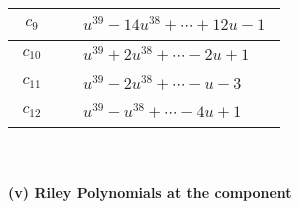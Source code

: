 \documentclass[1p]{elsarticle_modified}
\theoremstyle{definition}
\begin{document}
\begin{tabular}{m{50pt}|m{274pt}}
\hline $$\begin{aligned}c_{9}\end{aligned}$$&$\begin{aligned}
&u^{39}-14 u^{38}+\cdots+12 u-1
\end{aligned}$\\
\hline $$\begin{aligned}c_{10}\end{aligned}$$&$\begin{aligned}
&u^{39}+2 u^{38}+\cdots-2 u+1
\end{aligned}$\\
\hline $$\begin{aligned}c_{11}\end{aligned}$$&$\begin{aligned}
&u^{39}-2 u^{38}+\cdots- u-3
\end{aligned}$\\
\hline $$\begin{aligned}c_{12}\end{aligned}$$&$\begin{aligned}
&u^{39}- u^{38}+\cdots-4 u+1
\end{aligned}$\\
\hline
\end{tabular}\\~\\
\newpage\renewcommand{\arraystretch}{1}
\flushleft \textbf{(v) Riley Polynomials at the component}\newline \\
\end{document}
